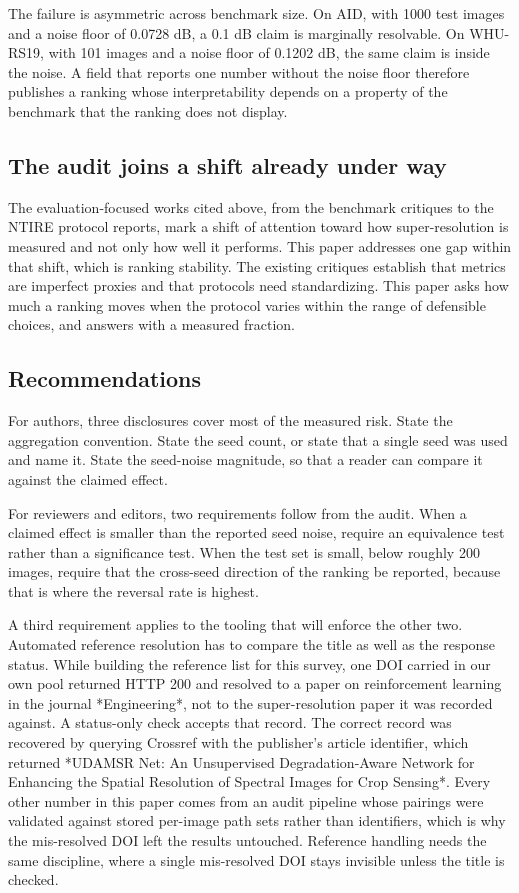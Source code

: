 \documentclass[pdflatex,sn-nature]{sn-jnl}
\begin{document}
The failure is asymmetric across benchmark size. On AID, with 1000 test images and a noise floor of 0.0728 dB, a 0.1 dB claim is marginally resolvable. On WHU-RS19, with 101 images and a noise floor of 0.1202 dB, the same claim is inside the noise. A field that reports one number without the noise floor therefore publishes a ranking whose interpretability depends on a property of the benchmark that the ranking does not display.

\subsection{The audit joins a shift already under way}\label{sec:shift}

The evaluation-focused works cited above, from the benchmark critiques to the NTIRE protocol reports, mark a shift of attention toward how super-resolution is measured and not only how well it performs. This paper addresses one gap within that shift, which is ranking stability. The existing critiques establish that metrics are imperfect proxies and that protocols need standardizing. This paper asks how much a ranking moves when the protocol varies within the range of defensible choices, and answers with a measured fraction.

\subsection{Recommendations}\label{sec:recommend}

For authors, three disclosures cover most of the measured risk. State the aggregation convention. State the seed count, or state that a single seed was used and name it. State the seed-noise magnitude, so that a reader can compare it against the claimed effect.

For reviewers and editors, two requirements follow from the audit. When a claimed effect is smaller than the reported seed noise, require an equivalence test rather than a significance test. When the test set is small, below roughly 200 images, require that the cross-seed direction of the ranking be reported, because that is where the reversal rate is highest.

A third requirement applies to the tooling that will enforce the other two. Automated reference resolution has to compare the title as well as the response status. While building the reference list for this survey, one DOI carried in our own pool returned HTTP 200 and resolved to a paper on reinforcement learning in the journal *Engineering*, not to the super-resolution paper it was recorded against. A status-only check accepts that record. The correct record was recovered by querying Crossref with the publisher's article identifier, which returned *UDAMSR Net: An Unsupervised Degradation-Aware Network for Enhancing the Spatial Resolution of Spectral Images for Crop Sensing*. Every other number in this paper comes from an audit pipeline whose pairings were validated against stored per-image path sets rather than identifiers, which is why the mis-resolved DOI left the results untouched. Reference handling needs the same discipline, where a single mis-resolved DOI stays invisible unless the title is checked.
\end{document}
